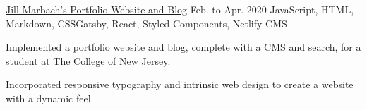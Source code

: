 
\begin{cventry}
    {\href{https://jillmarbach.com}{Jill Marbach's Portfolio Website and Blog}}{}
    {Feb. to Apr. 2020}
    {JavaScript, HTML, Markdown, CSS}{Gatsby, React, Styled Components, Netlify CMS}
    \begin{cvitems}
        \item Implemented a portfolio website and blog, complete with a CMS and search, for a student at The College of New Jersey.
        \item Incorporated responsive typography and intrinsic web design to create a website with a dynamic feel.
    \end{cvitems}
\end{cventry}

\begin{comment}
    \begin{cventry}
        {The Dandy Programming Language}{}
        {April 2019 to Present}
        {Kotlin}{ANTLR}
        \begin{cvitems}
            \item Designing and programming a compiler for a novel multi-paradigm functional/imperative programming language with parametric polymorphism, higher kinded types, and comprehensive type inference.
        \end{cvitems}
    \end{cventry}
\end{comment}

\begin{comment}
    \begin{cventry}
        {Spotify Web API Wrapper and Object-Relational Mapping}{}
        {Jan. 2019 to Present}
        {TypeScript}{Rollup.js, Babel}
        \begin{cvitems}
            \item Developing an isomorphic Spotify Web API wrapper in \textsl{TypeScript} with an object-oriented abstraction layer.
            \item Implementing automatic paging, OAuth token refreshing, and rate-limit timeouts.
        \end{cvitems}  
    \end{cventry}    
\end{comment}

\begin{comment}
    \begin{cventry}
        {Functional Linear Algebra Library}{}
        {Aug. to Dec. 2018}
        {Kotlin}{Gradle}
        \begin{cvitems}
            \item Implemented a functional linear algebra library with lazy evaluation and function composition.
            \item Inspired by the Kotlin Sequence interface.
        \end{cvitems}  
    \end{cventry}
\end{comment}

